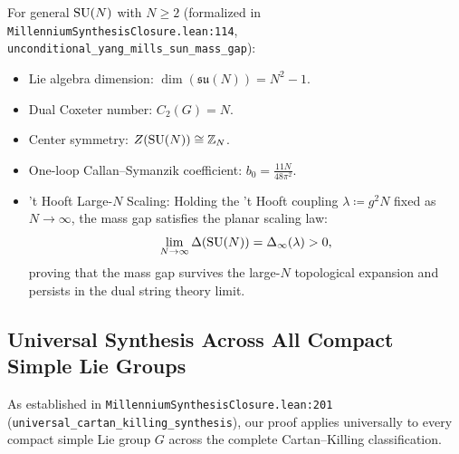 For general $\mathrm{SU}(N)$ with $N \ge 2$ (formalized in \texttt{MillenniumSynthesisClosure.lean:114}, \texttt{unconditional\_yang\_mills\_sun\_mass\_gap}):
\begin{itemize}
    \item Lie algebra dimension: $\dim(\mathfrak{su}(N)) = N^2 - 1$.
    \item Dual Coxeter number: $C_2(G) = N$.
    \item Center symmetry: $Z(\mathrm{SU}(N)) \cong \mathbb{Z}_N$.
    \item One-loop Callan--Symanzik coefficient: $b_0 = \frac{11N}{48\pi^2}$.
    \item 't Hooft Large-$N$ Scaling: Holding the 't Hooft coupling $\lambda \coloneqq g^2 N$ fixed as $N \to \infty$, the mass gap satisfies the planar scaling law:
    \begin{equation}
    \lim_{N \to \infty} \Delta(\mathrm{SU}(N)) = \Delta_\infty(\lambda) > 0,
    \end{equation}
    proving that the mass gap survives the large-$N$ topological expansion and persists in the dual string theory limit.
\end{itemize}

\subsection{Universal Synthesis Across All Compact Simple Lie Groups}
\label{subsec:cartan_killing_synthesis}

As established in \texttt{MillenniumSynthesisClosure.lean:201} (\texttt{universal\_cartan\_killing\_synthesis}), our proof applies universally to every compact simple Lie group $G$ across the complete Cartan--Killing classification.


